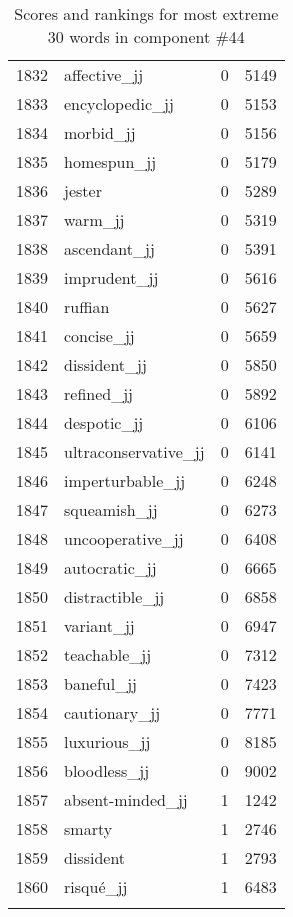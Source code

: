 \begin{longtable}[!htbp]{| rlr@{.}l |}
    1832 & affective\_jj & 0 & 5149 \\
    1833 & encyclopedic\_jj & 0 & 5153 \\
    1834 & morbid\_jj & 0 & 5156 \\
    1835 & homespun\_jj & 0 & 5179 \\
    1836 & jester & 0 & 5289 \\
    1837 & warm\_jj & 0 & 5319 \\
    1838 & ascendant\_jj & 0 & 5391 \\
    1839 & imprudent\_jj & 0 & 5616 \\
    1840 & ruffian & 0 & 5627 \\
    1841 & concise\_jj & 0 & 5659 \\
    1842 & dissident\_jj & 0 & 5850 \\
    1843 & refined\_jj & 0 & 5892 \\
    1844 & despotic\_jj & 0 & 6106 \\
    1845 & ultraconservative\_jj & 0 & 6141 \\
    1846 & imperturbable\_jj & 0 & 6248 \\
    1847 & squeamish\_jj & 0 & 6273 \\
    1848 & uncooperative\_jj & 0 & 6408 \\
    1849 & autocratic\_jj & 0 & 6665 \\
    1850 & distractible\_jj & 0 & 6858 \\
    1851 & variant\_jj & 0 & 6947 \\
    1852 & teachable\_jj & 0 & 7312 \\
    1853 & baneful\_jj & 0 & 7423 \\
    1854 & cautionary\_jj & 0 & 7771 \\
    1855 & luxurious\_jj & 0 & 8185 \\
    1856 & bloodless\_jj & 0 & 9002 \\
    1857 & absent-minded\_jj & 1 & 1242 \\
    1858 & smarty & 1 & 2746 \\
    1859 & dissident & 1 & 2793 \\
    1860 & risqué\_jj & 1 & 6483 \\
    \hline
    \caption{Scores and rankings for most extreme 30 words in component \#44} \\
\end{longtable}
